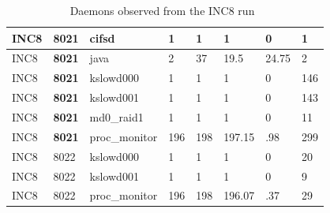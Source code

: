 \begin{table}[h]
\begin{center}
{\begin{tabular}{l|l|l|l|l|l|l|l}
INC8     & {\bf 8021}  & cifsd         & 1     & 1     & 1     & 0     & 1\\ \hline
INC8     & {\bf 8021}  & java  & 2     & 37    & 19.5  & 24.75         & 2\\ \hline
INC8     & {\bf 8021}  & kslowd000     & 1     & 1     & 1     & 0     & 146\\ \hline
INC8     & {\bf 8021}  & kslowd001     & 1     & 1     & 1     & 0     & 143\\ \hline
INC8     & {\bf 8021}  & md0\_raid1     & 1     & 1     & 1     & 0     & 11\\ \hline
INC8     & {\bf 8021}  & proc\_monitor  & 196   & 198   & 197.15        & .98   & 299\\ \hline\hline

INC8     & 8022  & kslowd000     & 1     & 1     & 1     & 0     & 20\\ \hline
INC8     & 8022  & kslowd001     & 1     & 1     & 1     & 0     & 9\\ \hline
INC8     & 8022  & proc\_monitor  & 196   & 198   & 196.07        & .37   & 29\\ \hline\hline
\end{tabular}
}
\end{center}
\caption{Daemons observed from the INC8 run~\label{tab:inc8_daemons}}
\end{table}

